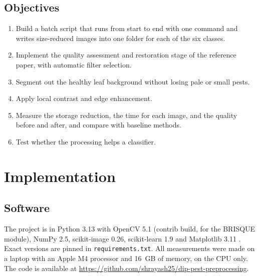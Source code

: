 \documentclass[12pt,a4paper]{article}
\let\oldsection\section
\renewcommand{\section}{\clearpage\oldsection}
\newcommand{\repourl}{https://github.com/shrayash25/dip-pest-preprocessing}
\begin{document}
\subsection{Objectives}
\begin{enumerate}[nosep]
\item Build a batch script that runs from start to end with one command and writes size-reduced images into one folder for each of the six classes.
\item Implement the quality assessment and restoration stage of the reference paper, with automatic filter selection.
\item Segment out the healthy leaf background without losing pale or small pests.
\item Apply local contrast and edge enhancement.
\item Measure the storage reduction, the time for each image, and the quality before and after, and compare with baseline methods.
\item Test whether the processing helps a classifier.
\end{enumerate}




\section{Implementation}

\subsection{Software}
The project is in Python 3.13 with OpenCV 5.1 (contrib build, for the BRISQUE module), NumPy 2.5, scikit-image 0.26, scikit-learn 1.9 and Matplotlib 3.11 \cite{opencv,scikit-image,scikit-learn}. Exact versions are pinned in \texttt{requirements.txt}. All measurements were made on a laptop with an Apple M4 processor and 16~GB of memory, on the CPU only. The code is available at \url{\repourl}.
\end{document}

